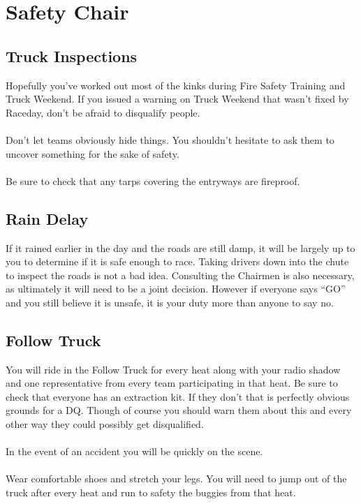 \section{Safety Chair}
\subsection{Truck Inspections}
Hopefully you've worked out most of the kinks during Fire Safety Training
and Truck Weekend. If you issued a warning on Truck Weekend that wasn't
fixed by Raceday, don't be afraid to disqualify people.
\\\\
Don't let teams obviously hide things. You shouldn't hesitate to ask them to
uncover something for the sake of safety.
\\\\
Be sure to check that any tarps covering the entryways are fireproof.

\subsection{Rain Delay}
If it rained earlier in the day and the roads are still damp, it will be
largely up to you to determine if it is safe enough to race. Taking drivers
down into the chute to inspect the roads is not a bad idea. Consulting the
Chairmen is also necessary, as ultimately it will need to be a joint decision.
However if everyone says ``GO'' and you still believe it is unsafe, it is your
duty more than anyone to say no.

\subsection{Follow Truck}
You will ride in the Follow Truck for every heat along with your radio shadow
and one representative from every team participating in that heat.
Be sure to check that everyone has an extraction kit. If they don't that is
perfectly obvious grounds for a DQ. Though of course you should warn them about
this and every other way they could possibly get disqualified.
\\\\
In the event of an accident you will be quickly on the scene.
\\\\
Wear comfortable shoes and stretch your legs. You will need to jump out of the
truck after every heat and run to safety the buggies from that heat.

